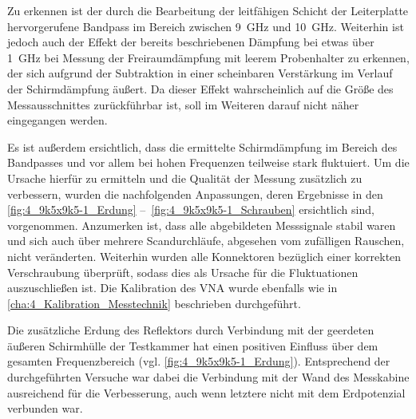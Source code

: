 Zu erkennen ist der durch die Bearbeitung der leitfähigen Schicht der Leiterplatte hervorgerufene Bandpass im Bereich zwischen \SI{9}{\giga\hertz} und \SI{10}{\giga\hertz}. Weiterhin ist jedoch auch der Effekt der bereits beschriebenen Dämpfung bei etwas über \SI{1}{\giga\hertz} bei Messung der Freiraumdämpfung mit leerem Probenhalter zu erkennen, der sich aufgrund der Subtraktion in einer scheinbaren Verstärkung im Verlauf der Schirmdämpfung äußert. Da dieser Effekt wahrscheinlich auf die Größe des Messausschnittes zurückführbar ist, soll im Weiteren darauf nicht näher eingegangen werden. 
\par
\vspace{\linespace}
Es ist außerdem ersichtlich, dass die ermittelte Schirmdämpfung im Bereich des Bandpasses und vor allem bei hohen Frequenzen teilweise stark fluktuiert. Um die Ursache hierfür zu ermitteln und die Qualität der Messung zusätzlich zu verbessern, wurden die nachfolgenden Anpassungen, deren Ergebnisse in den \Abbildungen\ref{fig:4_9k5x9k5-1_Erdung} --~\ref{fig:4_9k5x9k5-1_Schrauben} ersichtlich sind, vorgenommen. Anzumerken ist, dass alle abgebildeten Messsignale stabil waren und sich auch über mehrere Scandurchläufe, abgesehen vom zufälligen Rauschen, nicht veränderten. Weiterhin wurden alle Konnektoren bezüglich einer korrekten Verschraubung überprüft, sodass dies als Ursache für die Fluktuationen auszuschließen ist. Die Kalibration des VNA wurde ebenfalls wie in \Abschnitt\ref{cha:4_Kalibration_Messtechnik} beschrieben durchgeführt. 
\par
\vspace{\linespace}
Die zusätzliche Erdung des Reflektors durch Verbindung mit der geerdeten äußeren Schirmhülle der Testkammer hat einen positiven Einfluss über dem gesamten Frequenzbereich (vgl. \Abb\ref{fig:4_9k5x9k5-1_Erdung}). Entsprechend der durchgeführten Versuche war dabei die Verbindung mit der Wand des Messkabine ausreichend für die Verbesserung, auch wenn letztere nicht mit dem Erdpotenzial verbunden war.  
\par
\vspace{\linespace}

